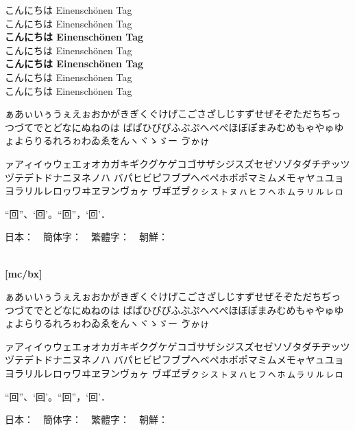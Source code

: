 \documentclass[a4paper,titlepage, draft]{\class}
\begin{document}
{\footnotesize
\makeatletter\if@deluxe
{\mcfamily\ltseries
{}   %
こんにちは Einenschönen Tag\\
}%
\fi\makeatother
{\mcfamily
{}   %
こんにちは Einenschönen Tag\\
}%
{\mcfamily\bfseries
{}   %
こんにちは Einenschönen Tag\\
}%
{\gtfamily
{}   %
こんにちは Einenschönen Tag\\
}%
{\gtfamily\bfseries
{}   %
こんにちは Einenschönen Tag\\
}%
\makeatletter\if@deluxe
{\gtfamily\ebseries
{}   %
こんにちは Einenschönen Tag\\
}%
{\mgfamily
{}   %
こんにちは Einenschönen Tag\\
}%
\fi\makeatother
}

\clearpage
[mc/m]

ぁあぃいぅうぇえぉおかがきぎくぐけげこごさざしじすずせぜそぞただちぢっつづてでとどなにぬねのは
ばぱひびぴふぶぷへべぺほぼぽまみむめもゃやゅゆょよらりるれろゎわゐゑをんヽヾゝゞー
\ifuptexmode
ゔゕゖ
\fi

ァアィイゥウェエォオカガキギクグケゲコゴサザシジスズセゼソゾタダチヂッツヅテデトドナニヌネノハ
バパヒビピフブプヘベペホボポマミムメモャヤュユョヨラリルレロヮワヰヱヲンヴヵヶ
\ifuptexmode
ヷヸヹヺㇰㇱㇲㇳㇴㇵㇶㇷㇸㇹㇺㇻㇼㇽㇾㇿ
\fi

“回”、‘回’。“回”，‘回’．

日本：~~簡体字：~~繁體字：~~朝鮮：\\
~~%
~~%

{\bfseries%
[mc/bx]

ぁあぃいぅうぇえぉおかがきぎくぐけげこごさざしじすずせぜそぞただちぢっつづてでとどなにぬねのは
ばぱひびぴふぶぷへべぺほぼぽまみむめもゃやゅゆょよらりるれろゎわゐゑをんヽヾゝゞー
\ifuptexmode
ゔゕゖ
\fi

ァアィイゥウェエォオカガキギクグケゲコゴサザシジスズセゼソゾタダチヂッツヅテデトドナニヌネノハ
バパヒビピフブプヘベペホボポマミムメモャヤュユョヨラリルレロヮワヰヱヲンヴヵヶ
\ifuptexmode
ヷヸヹヺㇰㇱㇲㇳㇴㇵㇶㇷㇸㇹㇺㇻㇼㇽㇾㇿ
\fi

“回”、‘回’。“回”，‘回’．

日本：~~簡体字：~~繁體字：~~朝鮮：\\
~~%
~~%
}
\end{document}
